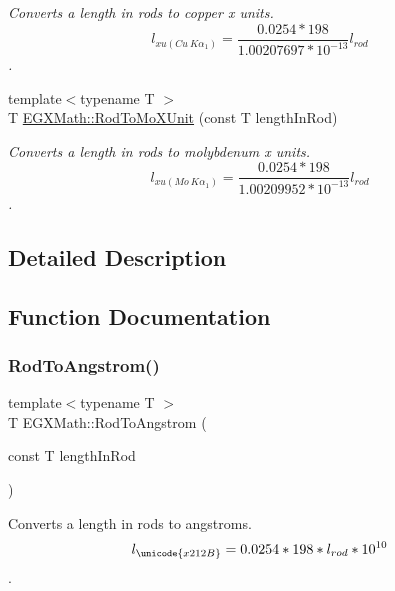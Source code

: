 \begin{DoxyCompactItemize}
\begin{DoxyCompactList}\small\item\em Converts a length in rods to copper x units. \[ l_{xu(Cu\ K\alpha_1)}=\frac{0.0254 * 198}{1.00207697*10^{-13}} l_{rod}\]. \end{DoxyCompactList}\item 
{\footnotesize template$<$typename T $>$ }\\T \mbox{\hyperlink{group___e_g_x_math-_conversions-_length_conversions-_surveyors-_rod-_non-_s_i_gac5c3c27eea891ef32353d16c6b8c57ab}{E\+G\+X\+Math\+::\+Rod\+To\+Mo\+X\+Unit}} (const T length\+In\+Rod)
\begin{DoxyCompactList}\small\item\em Converts a length in rods to molybdenum x units. \[ l_{xu(Mo\ K\alpha_1)}=\frac{0.0254 * 198}{1.00209952*10^{-13}} l_{rod}\]. \end{DoxyCompactList}\end{DoxyCompactItemize}


\subsection{Detailed Description}


\subsection{Function Documentation}
\mbox{\label{group___e_g_x_math-_conversions-_length_conversions-_surveyors-_rod-_non-_s_i_ga079b9122c8747685d7057ec05fefdb7f}} 
\subsubsection{\texorpdfstring{Rod\+To\+Angstrom()}{RodToAngstrom()}}
{\footnotesize\ttfamily template$<$typename T $>$ \\
T E\+G\+X\+Math\+::\+Rod\+To\+Angstrom (\begin{DoxyParamCaption}\item[{const T}]{length\+In\+Rod }\end{DoxyParamCaption})}



Converts a length in rods to angstroms. \[ l_{\unicode{x212B}}=0.0254 * 198 * l_{rod} * 10^{10} \]. 

